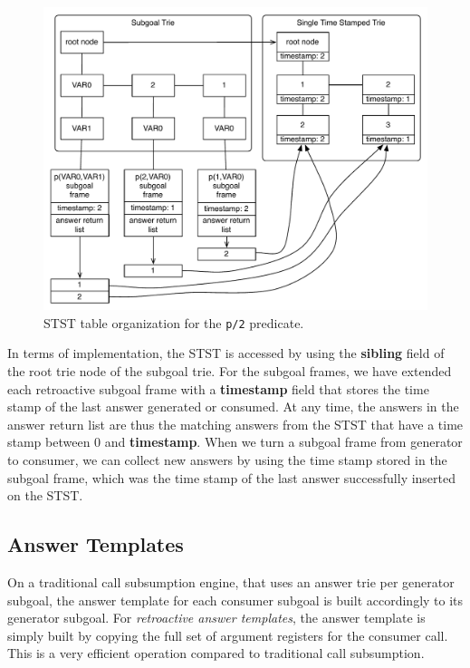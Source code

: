 \begin{figure}[ht]
  \centering
    \includegraphics[scale=0.6]{stst.pdf}
  \caption{STST table organization for the \texttt{p/2} predicate.}
  \label{fig:stst}
\end{figure}

In terms of implementation, the STST is accessed by using the \textbf{sibling} field of the root
trie node of the subgoal trie.
For the subgoal frames, we have extended each retroactive subgoal
frame with a \textbf{timestamp} field that stores the time stamp of the last answer
generated or consumed.
At any time, the answers in the answer return list are thus the matching 
answers from the STST that have a time stamp between 0 and \textbf{timestamp}.
When we turn a subgoal frame from generator to consumer,
we can collect new answers by using the time stamp stored in the subgoal frame, which was the
time stamp of the last answer successfully inserted on the STST.

\subsection{Answer Templates}

On a traditional call subsumption engine, that uses an answer trie per generator subgoal,
the answer template for each consumer subgoal is built accordingly to its generator subgoal.
For \textit{retroactive answer templates}, the answer template is simply built by copying
the full set of argument registers for the consumer call. This is a very efficient operation
compared to traditional call subsumption.

